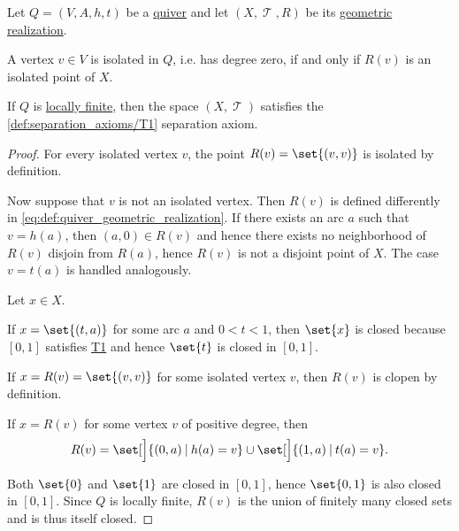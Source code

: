 \begin{proposition}\label{thm:def:quiver_geometric_realization}
  Let \( Q = (V, A, h, t) \) be a \hyperref[def:quiver]{quiver} and let \( (X, \mscrT, R) \) be its \hyperref[def:quiver_geometric_realization]{geometric realization}.

  \begin{thmenum}
     A vertex \( v \in V \) is isolated in \( Q \), i.e. has degree zero, if and only if \( R(v) \) is an isolated point of \( X \).

     If \( Q \) is \hyperref[def:hypergraph/degree]{locally finite}, then the space \( (X, \mscrT) \) satisfies the \ref{def:separation_axioms/T1} separation axiom.
  \end{thmenum}
\end{proposition}
\begin{proof}
   For every isolated vertex \( v \), the point \( R(v) = \set{ (v, v) } \) is isolated by definition.

  Now suppose that \( v \) is not an isolated vertex. Then \( R(v) \) is defined differently in \eqref{eq:def:quiver_geometric_realization}. If there exists an arc \( a \) such that \( v = h(a) \), then \( (a, 0) \in R(v) \) and hence there exists no neighborhood of \( R(v) \) disjoin from \( R(a) \), hence \( R(v) \) is not a disjoint point of \( X \). The case \( v = t(a) \) is handled analogously.

   Let \( x \in X \).

  If \( x = \set{ (t, a) } \) for some arc \( a \) and \( 0 < t < 1 \), then \( \set{ x } \) is closed because \( [0, 1] \) satisfies \hyperref[def:separation_axioms/T1]{T1} and hence \( \set{ t } \) is closed in \( [0, 1] \).

  If \( x = R(v) = \set{ (v, v) } \) for some isolated vertex \( v \), then \( R(v) \) is clopen by definition.

  If \( x = R(v) \) for some vertex \( v \) of positive degree, then
  \begin{equation*}
    R(v) = \set[\Big]{ (0, a) \given h(a) = v } \cup \set[\Big]{ (1, a) \given t(a) = v }.
  \end{equation*}

  Both \( \set{ 0 } \) and \( \set{ 1 } \) are closed in \( [0, 1] \), hence \( \set{ 0, 1 } \) is also closed in \( [0, 1] \). Since \( Q \) is locally finite, \( R(v) \) is the union of finitely many closed sets and is thus itself closed.
\end{proof}

